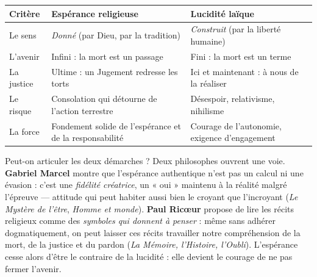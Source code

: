 \documentclass[11pt]{article}
\begin{document}
\begin{center}
\begin{tabularx}{\linewidth}{|l|X|X|}
\hline
\rowcolor{popblueL} \textbf{Critère} & \textbf{Espérance religieuse} & \textbf{Lucidité laïque} \\
\hline
Le sens & \emph{Donné} (par Dieu, par la tradition) & \emph{Construit} (par la liberté humaine) \\
\hline
L'avenir & Infini : la mort est un passage & Fini : la mort est un terme \\
\hline
La justice & Ultime : un Jugement redresse les torts & Ici et maintenant : à nous de la réaliser \\
\hline
Le risque & Consolation qui détourne de l'action terrestre & Désespoir, relativisme, nihilisme \\
\hline
La force & Fondement solide de l'espérance et de la responsabilité & Courage de l'autonomie, exigence d'engagement \\
\hline
\end{tabularx}
\end{center}

Peut-on articuler les deux démarches ? Deux philosophes ouvrent une voie. \textbf{Gabriel Marcel} montre que l'espérance authentique n'est pas un calcul ni une évasion : c'est une \emph{fidélité créatrice}, un « oui » maintenu à la réalité malgré l'épreuve — attitude qui peut habiter aussi bien le croyant que l'incroyant (\emph{Le Mystère de l'être}, \emph{Homme et monde}). \textbf{Paul Ricœur} propose de lire les récits religieux comme des \emph{symboles qui donnent à penser} : même sans adhérer dogmatiquement, on peut laisser ces récits travailler notre compréhension de la mort, de la justice et du pardon (\emph{La Mémoire, l'Histoire, l'Oubli}). L'espérance cesse alors d'être le contraire de la lucidité : elle devient le courage de ne pas fermer l'avenir.
\end{document}
